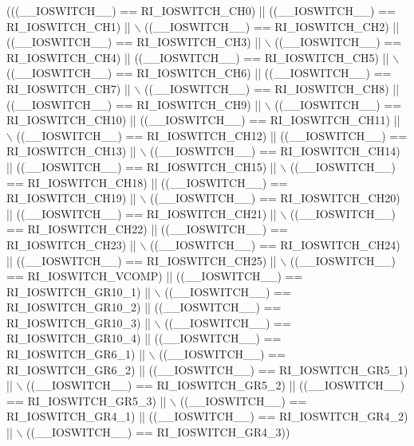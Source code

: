 \begin{DoxyCode}
(((\_\_IOSWITCH\_\_) == RI\_IOSWITCH\_CH0) || ((\_\_IOSWITCH\_\_) == RI\_IOSWITCH\_CH1)    || \(\backslash\)
                                  ((\_\_IOSWITCH\_\_) == RI\_IOSWITCH\_CH2)     || ((\_\_IOSWITCH\_\_) == 
      RI\_IOSWITCH\_CH3)    || \(\backslash\)
                                  ((\_\_IOSWITCH\_\_) == RI\_IOSWITCH\_CH4)     || ((\_\_IOSWITCH\_\_) == 
      RI\_IOSWITCH\_CH5)    || \(\backslash\)
                                  ((\_\_IOSWITCH\_\_) == RI\_IOSWITCH\_CH6)     || ((\_\_IOSWITCH\_\_) == 
      RI\_IOSWITCH\_CH7)    || \(\backslash\)
                                  ((\_\_IOSWITCH\_\_) == RI\_IOSWITCH\_CH8)     || ((\_\_IOSWITCH\_\_) == 
      RI\_IOSWITCH\_CH9)    || \(\backslash\)
                                  ((\_\_IOSWITCH\_\_) == RI\_IOSWITCH\_CH10)    || ((\_\_IOSWITCH\_\_) == 
      RI\_IOSWITCH\_CH11)   || \(\backslash\)
                                  ((\_\_IOSWITCH\_\_) == RI\_IOSWITCH\_CH12)    || ((\_\_IOSWITCH\_\_) == 
      RI\_IOSWITCH\_CH13)   || \(\backslash\)
                                  ((\_\_IOSWITCH\_\_) == RI\_IOSWITCH\_CH14)    || ((\_\_IOSWITCH\_\_) == 
      RI\_IOSWITCH\_CH15)   || \(\backslash\)
                                  ((\_\_IOSWITCH\_\_) == RI\_IOSWITCH\_CH18)    || ((\_\_IOSWITCH\_\_) == 
      RI\_IOSWITCH\_CH19)   || \(\backslash\)
                                  ((\_\_IOSWITCH\_\_) == RI\_IOSWITCH\_CH20)    || ((\_\_IOSWITCH\_\_) == 
      RI\_IOSWITCH\_CH21)   || \(\backslash\)
                                  ((\_\_IOSWITCH\_\_) == RI\_IOSWITCH\_CH22)    || ((\_\_IOSWITCH\_\_) == 
      RI\_IOSWITCH\_CH23)   || \(\backslash\)
                                  ((\_\_IOSWITCH\_\_) == RI\_IOSWITCH\_CH24)    || ((\_\_IOSWITCH\_\_) == 
      RI\_IOSWITCH\_CH25)   || \(\backslash\)
                                  ((\_\_IOSWITCH\_\_) == RI\_IOSWITCH\_VCOMP)   || ((\_\_IOSWITCH\_\_) == 
      RI\_IOSWITCH\_GR10\_1) || \(\backslash\)
                                  ((\_\_IOSWITCH\_\_) == RI\_IOSWITCH\_GR10\_2)  || ((\_\_IOSWITCH\_\_) == 
      RI\_IOSWITCH\_GR10\_3) || \(\backslash\)
                                  ((\_\_IOSWITCH\_\_) == RI\_IOSWITCH\_GR10\_4)  || ((\_\_IOSWITCH\_\_) == 
      RI\_IOSWITCH\_GR6\_1)  || \(\backslash\)
                                  ((\_\_IOSWITCH\_\_) == RI\_IOSWITCH\_GR6\_2)   || ((\_\_IOSWITCH\_\_) == 
      RI\_IOSWITCH\_GR5\_1)  || \(\backslash\)
                                  ((\_\_IOSWITCH\_\_) == RI\_IOSWITCH\_GR5\_2)   || ((\_\_IOSWITCH\_\_) == 
      RI\_IOSWITCH\_GR5\_3)  || \(\backslash\)
                                  ((\_\_IOSWITCH\_\_) == RI\_IOSWITCH\_GR4\_1)   || ((\_\_IOSWITCH\_\_) == 
      RI\_IOSWITCH\_GR4\_2)  || \(\backslash\)
                                  ((\_\_IOSWITCH\_\_) == RI\_IOSWITCH\_GR4\_3))
\end{DoxyCode}
